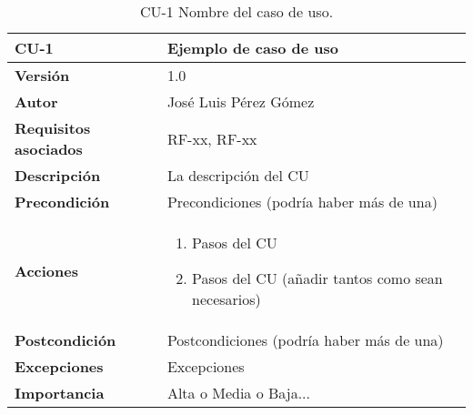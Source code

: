 \begin{table}[p]
	\centering
	\begin{tabularx}{\linewidth}{ p{} p{} }
		\toprule
		\textbf{CU-1}    & \textbf{Ejemplo de caso de uso}\\
		\toprule
		\textbf{Versión}              & 1.0    \\
		\textbf{Autor}                & José Luis Pérez Gómez \\
		\textbf{Requisitos asociados} & RF-xx, RF-xx \\
		\textbf{Descripción}          & La descripción del CU \\
		\textbf{Precondición}         & Precondiciones (podría haber más de una) \\
		\textbf{Acciones}             &
		\begin{enumerate}
			\def\labelenumi{\arabic{enumi}.}
			\tightlist
			\item Pasos del CU
			\item Pasos del CU (añadir tantos como sean necesarios)
		\end{enumerate}\\
		\textbf{Postcondición}        & Postcondiciones (podría haber más de una) \\
		\textbf{Excepciones}          & Excepciones \\
		\textbf{Importancia}          & Alta o Media o Baja... \\
		\bottomrule
	\end{tabularx}
	\caption{CU-1 Nombre del caso de uso.}
\end{table}


